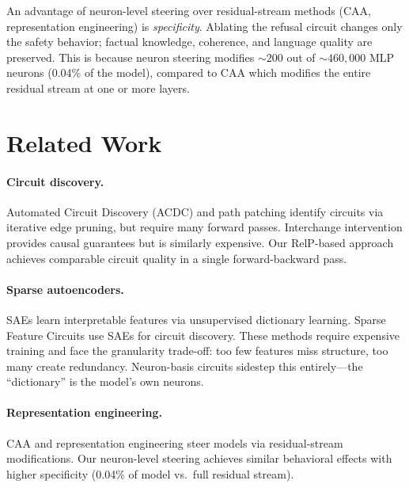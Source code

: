 \documentclass[11pt]{article}
\begin{document}
An advantage of neuron-level steering over residual-stream methods (CAA, representation engineering) is \emph{specificity}.
Ablating the refusal circuit changes only the safety behavior; factual knowledge, coherence, and language quality are preserved.
This is because neuron steering modifies ${\sim}200$ out of ${\sim}460{,}000$ MLP neurons (0.04\% of the model), compared to CAA which modifies the entire residual stream at one or more layers.


\section{Related Work}
\label{sec:related}

\paragraph{Circuit discovery.}
Automated Circuit Discovery (ACDC) \citep{conmy2023acdc} and path patching \citep{goldowskydill2023localizing} identify circuits via iterative edge pruning, but require many forward passes.
Interchange intervention \citep{geiger2024interchange} provides causal guarantees but is similarly expensive.
Our RelP-based approach achieves comparable circuit quality in a single forward-backward pass.

\paragraph{Sparse autoencoders.}
SAEs \citep{cunningham2023sae, bricken2023monosemanticity, templeton2024scaling} learn interpretable features via unsupervised dictionary learning.
Sparse Feature Circuits \citep{marks2024sparse} use SAEs for circuit discovery.
These methods require expensive training and face the granularity trade-off: too few features miss structure, too many create redundancy.
Neuron-basis circuits sidestep this entirely---the ``dictionary'' is the model's own neurons.

\paragraph{Representation engineering.}
CAA \citep{rimsky2024steering} and representation engineering \citep{zou2023representation} steer models via residual-stream modifications.
Our neuron-level steering achieves similar behavioral effects with higher specificity (0.04\% of model vs.\ full residual stream).
\end{document}

